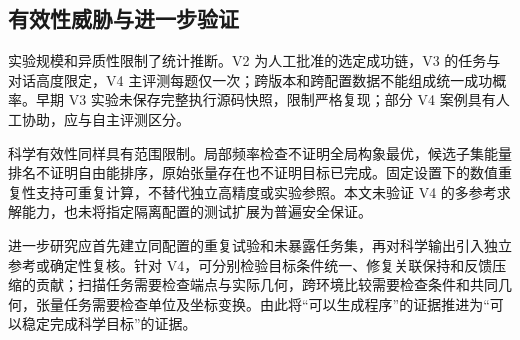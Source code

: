 \subsection{有效性威胁与进一步验证}
实验规模和异质性限制了统计推断。V2 为人工批准的选定成功链，V3 的任务与对话高度限定，V4 主评测每题仅一次；跨版本和跨配置数据不能组成统一成功概率。早期 V3 实验未保存完整执行源码快照，限制严格复现；部分 V4 案例具有人工协助，应与自主评测区分。

科学有效性同样具有范围限制。局部频率检查不证明全局构象最优，候选子集能量排名不证明自由能排序，原始张量存在也不证明目标已完成。固定设置下的数值重复性支持可重复计算，不替代独立高精度或实验参照。本文未验证 V4 的多参考求解能力，也未将指定隔离配置的测试扩展为普遍安全保证。

进一步研究应首先建立同配置的重复试验和未暴露任务集，再对科学输出引入独立参考或确定性复核。针对 V4，可分别检验目标条件统一、修复关联保持和反馈压缩的贡献；扫描任务需要检查端点与实际几何，跨环境比较需要检查条件和共同几何，张量任务需要检查单位及坐标变换。由此将“可以生成程序”的证据推进为“可以稳定完成科学目标”的证据。
